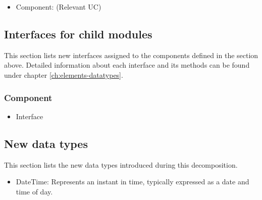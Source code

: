     \begin{itemize}
        \item Component: (Relevant UC)
    \end{itemize}


\subsection{Interfaces for child modules}
    This section lists new interfaces assigned to the components defined
    in the section above. Detailed information about each interface and
    its methods can be found under chapter \ref{ch:elements-datatypes}.

    \subsubsection{Component}
        \begin{itemize}
            \item Interface
        \end{itemize}

\subsection{New data types}
    This section lists the new data types introduced during this decomposition.

    \begin{itemize}
        \item DateTime: Represents an instant in time, typically expressed as a date and time of day.
    \end{itemize}
